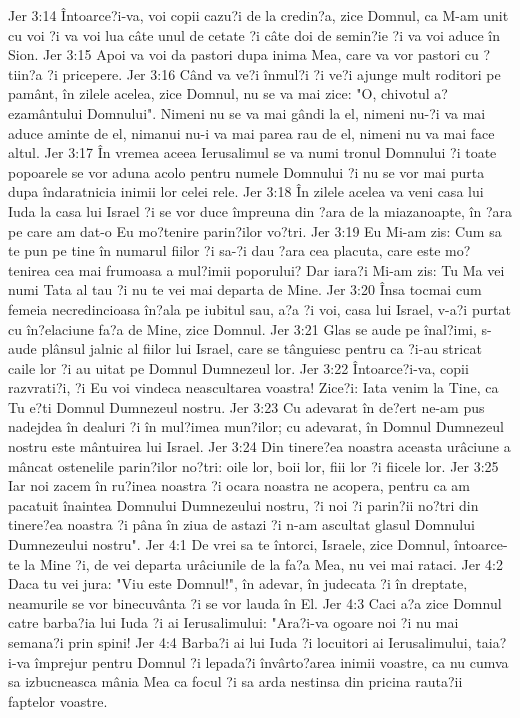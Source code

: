 Jer 3:14  Întoarce?i-va, voi copii cazu?i de la credin?a, zice Domnul, ca M-am unit cu voi ?i va voi lua câte unul de cetate ?i câte doi de semin?ie ?i va voi aduce în Sion.
Jer 3:15  Apoi va voi da pastori dupa inima Mea, care va vor pastori cu ?tiin?a ?i pricepere.
Jer 3:16  Când va ve?i înmul?i ?i ve?i ajunge mult roditori pe pamânt, în zilele acelea, zice Domnul, nu se va mai zice: "O, chivotul a?ezamântului Domnului". Nimeni nu se va mai gândi la el, nimeni nu-?i va mai aduce aminte de el, nimanui nu-i va mai parea rau de el, nimeni nu va mai face altul.
Jer 3:17  În vremea aceea Ierusalimul se va numi tronul Domnului ?i toate popoarele se vor aduna acolo pentru numele Domnului ?i nu se vor mai purta dupa îndaratnicia inimii lor celei rele.
Jer 3:18  În zilele acelea va veni casa lui Iuda la casa lui Israel ?i se vor duce împreuna din ?ara de la miazanoapte, în ?ara pe care am dat-o Eu mo?tenire parin?ilor vo?tri.
Jer 3:19  Eu Mi-am zis: Cum sa te pun pe tine în numarul fiilor ?i sa-?i dau ?ara cea placuta, care este mo?tenirea cea mai frumoasa a mul?imii poporului? Dar iara?i Mi-am zis: Tu Ma vei numi Tata al tau ?i nu te vei mai departa de Mine.
Jer 3:20  Însa tocmai cum femeia necredincioasa în?ala pe iubitul sau, a?a ?i voi, casa lui Israel, v-a?i purtat cu în?elaciune fa?a de Mine, zice Domnul.
Jer 3:21  Glas se aude pe înal?imi, s-aude plânsul jalnic al fiilor lui Israel, care se tânguiesc pentru ca ?i-au stricat caile lor ?i au uitat pe Domnul Dumnezeul lor.
Jer 3:22  Întoarce?i-va, copii razvrati?i, ?i Eu voi vindeca neascultarea voastra! Zice?i: Iata venim la Tine, ca Tu e?ti Domnul Dumnezeul nostru.
Jer 3:23  Cu adevarat în de?ert ne-am pus nadejdea în dealuri ?i în mul?imea mun?ilor; cu adevarat, în Domnul Dumnezeul nostru este mântuirea lui Israel.
Jer 3:24  Din tinere?ea noastra aceasta urâciune a mâncat ostenelile parin?ilor no?tri: oile lor, boii lor, fiii lor ?i fiicele lor.
Jer 3:25  Iar noi zacem în ru?inea noastra ?i ocara noastra ne acopera, pentru ca am pacatuit înaintea Domnului Dumnezeului nostru, ?i noi ?i parin?ii no?tri din tinere?ea noastra ?i pâna în ziua de astazi ?i n-am ascultat glasul Domnului Dumnezeului nostru".
Jer 4:1  De vrei sa te întorci, Israele, zice Domnul, întoarce-te la Mine ?i, de vei departa urâciunile de la fa?a Mea, nu vei mai rataci.
Jer 4:2  Daca tu vei jura: "Viu este Domnul!", în adevar, în judecata ?i în dreptate, neamurile se vor binecuvânta ?i se vor lauda în El.
Jer 4:3  Caci a?a zice Domnul catre barba?ia lui Iuda ?i ai Ierusalimului: "Ara?i-va ogoare noi ?i nu mai semana?i prin spini!
Jer 4:4  Barba?i ai lui Iuda ?i locuitori ai Ierusalimului, taia?i-va împrejur pentru Domnul ?i lepada?i învârto?area inimii voastre, ca nu cumva sa izbucneasca mânia Mea ca focul ?i sa arda nestinsa din pricina rauta?ii faptelor voastre.
